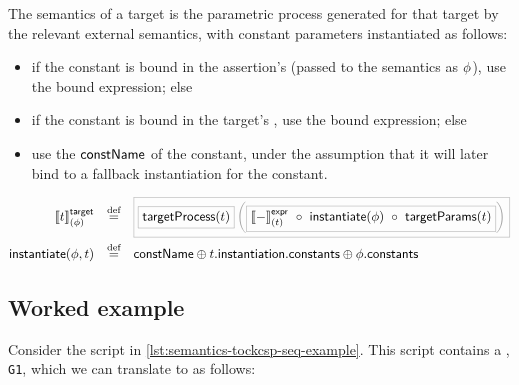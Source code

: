 \begin{definition}[\mtarget]

The semantics of a target is the parametric process generated for that
target by the relevant external semantics, with constant parameters instantiated
as follows:

\begin{itemize}
\item
	if the constant is bound in the assertion's \mtargetinstantiation{}
	(passed to the semantics as \(\phi\)), use the bound expression; else
\item
	if the constant is bound in the target's \mtargetinstantiation, use
	the bound expression; else
\item
	use the \(\mathsf{constName}\) of the constant, under the assumption
	that it will later bind to a fallback instantiation for the constant.
\end{itemize}
%
\begin{align*}
	\targetsema{\atarget}{\aninst}
\quad\defeq\quad&
\tlang{
	\olang{\funcname{targetProcess}(\atarget)}
	\left(
		\olang{\exprsema{-}{\atarget}\ \circ\ \funcname{instantiate}(\aninst)\ \circ\ \funcname{targetParams}(\atarget)}
	\right)
}
\\
	\funcname{instantiate}(\aninst, \atarget)
\quad\defeq\quad&
	\funcname{constName}
	\oplus
	\field{\field{\atarget}{instantiation}}{constants}
	\oplus
	\field{\aninst}{constants}
\end{align*}
\end{definition}

\subsection{Worked example}\label{ssec:semantics-tockcsp-seq-example}



Consider the \langname{} script in
\cref{lst:semantics-tockcsp-seq-example}.  This script contains a
\msequenceassertion, \texttt{G1}, which we can translate to \tockcsp{} as follows:



